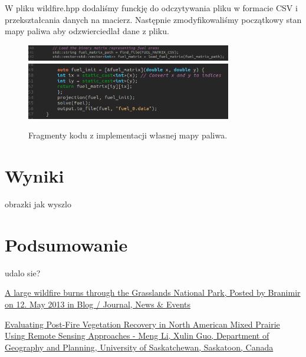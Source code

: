 \documentclass[onecolumn,12pt]{article}
\begin{document}
W pliku wildfire.hpp dodaliśmy funckję do odczytywania pliku w formacie CSV i przekształcania danych na macierz. Następnie zmodyfikowaliśmy początkowy stan mapy paliwa aby odzwierciedlał dane z pliku.

\begin{figure}[H]
    \centering
    \includegraphics[width=0.8\textwidth]{fuel_map.png}
    \includegraphics[width=0.8\textwidth]{fuel_map1.png}
    \caption{Fragmenty kodu z implementacji własnej mapy paliwa.}
    \label{fig:example}
\end{figure}

\section{Wyniki}
obrazki jak wyszlo

\section{Podsumowanie}
udalo sie? 


\begin{thebibliography}{9}
\href{https://branimirphoto.ca/blog/large-wildfire-burns-through-grasslands-national-park/?fbclid=IwAR10kOfZ03ZdSA12SXVjLDHnmQG8NzV8OXMnwMuYOwZUxyNMMgC7XqHOckw_aem_AbSe3suVXvDvsGvdxdkNPY61Ds63z0wXnrUig_4ZAZlJKoCI8yTPzsxj7_aTuKwY23cInpSUM9UzOpykvzHxRB74}{A large wildfire burns through the Grasslands National Park, Posted by Branimir on 12. May 2013 in Blog / Journal, News & Events}

\href{https://www.researchgate.net/figure/The-study-area-is-located-at-the-West-Block-of-Grasslands-National-Park-Canada_fig1_329806684?fbclid=IwAR3PFg0wUu8cTThq5SnfucD4vLfhBDSiHdCm0ItQ_X1MRRAb6wHOB7PSVHk_aem_AbSmS_GuLnzwRWPWYw2-HxWhtIl7nc200yLzsaJgKKWwgPnn3_5GDcWiLcBwMFFKeqdzxou109j5QDsGDAiHqe_6}{Evaluating Post-Fire Vegetation Recovery in North American Mixed Prairie Using Remote Sensing Approaches - Meng Li, Xulin Guo, Department of Geography and Planning, University of Saskatchewan, Saskatoon, Canada}
\end{thebibliography}
\end{document}
